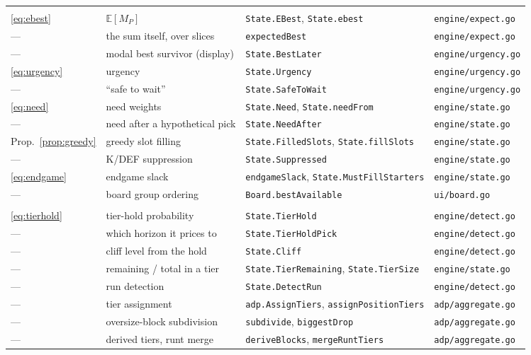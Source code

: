 \documentclass[10pt,a4paper]{article}
\theoremstyle{plain}
\theoremstyle{definition}
\theoremstyle{remark}
\newcommand{\code}[1]{\texttt{\small #1}}
\begin{document}
\begin{longtable}{@{}p{}p{}p{}p{}@{}}
\addlinespace
\multicolumn{4}{@{}l}{\emph{Expected best survivor, urgency, need}}\\[0.2em]
\eqref{eq:ebest} & $\mathbb{E}[M_P]$ & \code{State.EBest}, \code{State.ebest} & \code{engine/expect.go} \\
--- & the sum itself, over slices & \code{expectedBest} & \code{engine/expect.go} \\
--- & modal best survivor (display) & \code{State.BestLater} & \code{engine/urgency.go} \\
\eqref{eq:urgency} & urgency & \code{State.Urgency} & \code{engine/urgency.go} \\
--- & ``safe to wait'' & \code{State.SafeToWait} & \code{engine/urgency.go} \\
\eqref{eq:need} & need weights & \code{State.Need}, \code{State.needFrom} & \code{engine/state.go} \\
--- & need after a hypothetical pick & \code{State.NeedAfter} & \code{engine/state.go} \\
Prop.~\ref{prop:greedy} & greedy slot filling & \code{State.FilledSlots}, \code{State.fillSlots} & \code{engine/state.go} \\
--- & K/DEF suppression & \code{State.Suppressed} & \code{engine/state.go} \\
\eqref{eq:endgame} & endgame slack & \code{endgameSlack}, \code{State.MustFillStarters} & \code{engine/state.go} \\
--- & board group ordering & \code{Board.bestAvailable} & \code{ui/board.go} \\

\addlinespace
\multicolumn{4}{@{}l}{\emph{Tiers, cliffs, runs}}\\[0.2em]
\eqref{eq:tierhold} & tier-hold probability & \code{State.TierHold} & \code{engine/detect.go} \\
--- & which horizon it prices to & \code{State.TierHoldPick} & \code{engine/detect.go} \\
--- & cliff level from the hold & \code{State.Cliff} & \code{engine/detect.go} \\
--- & remaining / total in a tier & \code{State.TierRemaining}, \code{State.TierSize} & \code{engine/state.go} \\
--- & run detection & \code{State.DetectRun} & \code{engine/detect.go} \\
--- & tier assignment & \code{adp.AssignTiers}, \code{assignPositionTiers} & \code{adp/aggregate.go} \\
--- & oversize-block subdivision & \code{subdivide}, \code{biggestDrop} & \code{adp/aggregate.go} \\
--- & derived tiers, runt merge & \code{deriveBlocks}, \code{mergeRuntTiers} & \code{adp/aggregate.go} \\


\end{longtable}
\end{document}
